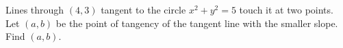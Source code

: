 Lines through $(4,3)$ tangent to the circle $x^2+y^2=5$ touch it at two points. Let $(a,b)$ be the point of tangency of the tangent line with the smaller slope. Find $(a,b)$.
